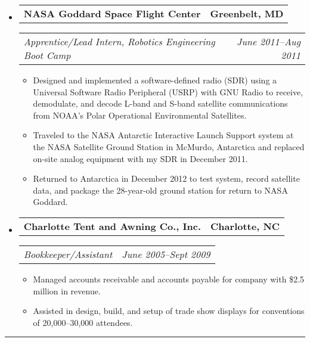 \documentclass[10pt,letterpaper]{article}
\newcommand{\headerrow}[2]{%
    \begin{tabularx}{\linewidth}{Xr}
	    #1 & #2 \\
    \end{tabularx}
}
\begin{document}
\begin{itemize}
	\item
	\headerrow{\textbf{NASA Goddard Space Flight Center}}{\textbf{Greenbelt, MD}}
	\headerrow{\textit{Apprentice/Lead Intern, Robotics Engineering Boot Camp}}
		{\textit{June 2011--Aug 2011}}
	\begin{itemize}
        \item Designed and implemented a software-defined radio (SDR) using a
            Universal Software Radio Peripheral (USRP) with GNU Radio to
            receive, demodulate, and decode L-band and S-band satellite
            communications from NOAA's Polar Operational Environmental
            Satellites.

        \item Traveled to the NASA Antarctic Interactive Launch Support
            system at the NASA Satellite Ground Station in McMurdo, Antarctica
            and replaced on-site analog equipment with my SDR in December 2011.

        \item Returned to Antarctica in December 2012 to test system, record
            satellite data, and package the 28-year-old ground station for
            return to NASA Goddard.
	\end{itemize}

	\item
	\headerrow{\textbf{Charlotte Tent and Awning Co., Inc.}}{\textbf{Charlotte, NC}}
	\headerrow{\textit{Bookkeeper/Assistant}}{\textit{June 2005--Sept 2009}}
	\begin{itemize}
        \item Managed accounts receivable and accounts payable for company with
            \$2.5 million in revenue.

        \item Assisted in design, build, and setup of trade show displays for
            conventions of 20,000--30,000 attendees.
	\end{itemize}

\end{itemize}

\hrule
\vspace{-0.4em}
\end{document}
